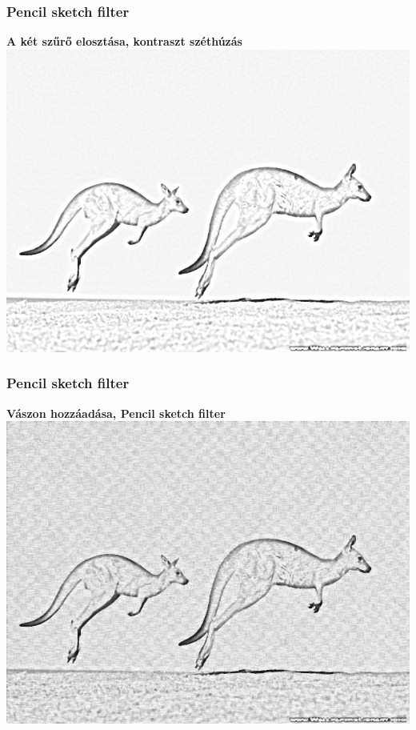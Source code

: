\documentclass{beamer}
\begin{document}
\begin{frame}[fragile]
\frametitle{Pencil sketch filter}
\begin{center}
\textbf{A két szűrő elosztása, kontraszt széthúzás}
\includegraphics[scale=0.42]{kepek/pencil_sketch/contraststrech.jpg}
\end{center}
\end{frame}

\begin{frame}[fragile]
\frametitle{Pencil sketch filter}
\begin{center}
\textbf{Vászon hozzáadása, Pencil sketch filter}
\includegraphics[scale=0.42]{kepek/pencil_sketch/pencil_sketch.jpg}
\end{center}
\end{frame}
\end{document}
